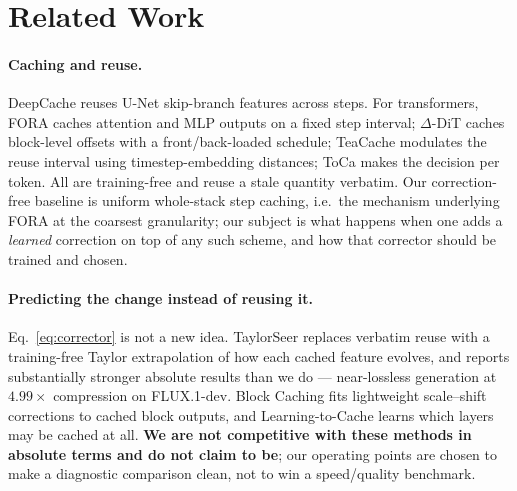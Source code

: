 \documentclass[10pt,twocolumn,letterpaper]{article}
\begin{document}
\section{Related Work}

\paragraph{Caching and reuse.} DeepCache \cite{ma2024deepcache} reuses U-Net
skip-branch features across steps. For transformers, FORA
\cite{selvaraju2024fora} caches attention and MLP outputs on a fixed step interval;
$\Delta$-DiT \cite{chen2024deltadit} caches block-level offsets with a
front/back-loaded schedule; TeaCache \cite{liu2024teacache} modulates the reuse
interval using timestep-embedding distances; ToCa \cite{zou2024toca} makes the
decision per token. All are training-free and reuse a stale quantity verbatim. Our
correction-free baseline is uniform whole-stack step caching, i.e.\ the mechanism
underlying FORA at the coarsest granularity; our subject is what happens when one
adds a \emph{learned} correction on top of any such scheme, and how that corrector
should be trained and chosen.

\paragraph{Predicting the change instead of reusing it.} Eq.~\ref{eq:corrector} is
not a new idea. TaylorSeer \cite{liu2025taylorseer} replaces verbatim reuse with a
training-free Taylor extrapolation of how each cached feature evolves, and reports
substantially stronger absolute results than we do --- near-lossless generation at
$4.99\times$ compression on FLUX.1-dev. Block Caching
\cite{wimbauer2024blockcaching} fits lightweight scale--shift corrections to cached
block outputs, and Learning-to-Cache \cite{ma2024l2c} learns which layers may be
cached at all. \textbf{We are not competitive with these methods in absolute terms and
do not claim to be}; our operating points are chosen to make a diagnostic comparison
clean, not to win a speed/quality benchmark.
\end{document}
